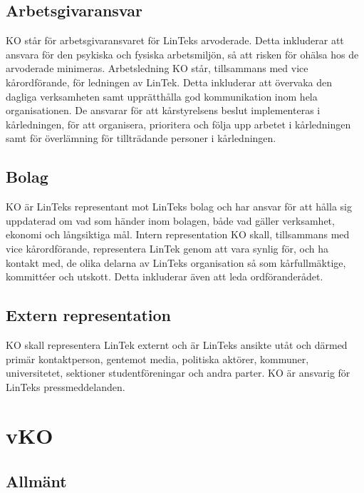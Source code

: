 \hypertarget{arbetsgivaransvar}{%
\subsection{Arbetsgivaransvar}\label{arbetsgivaransvar}}

KO står för arbetsgivaransvaret för LinTeks arvoderade. Detta inkluderar
att ansvara för den psykiska och fysiska arbetsmiljön, så att risken för
ohälsa hos de arvoderade minimeras. Arbetsledning KO står, tillsammans
med vice kårordförande, för ledningen av LinTek. Detta inkluderar att
övervaka den dagliga verksamheten samt upprätthålla god kommunikation
inom hela organisationen. De ansvarar för att kårstyrelsens beslut
implementeras i kårledningen, för att organisera, prioritera och följa
upp arbetet i kårledningen samt för överlämning för tillträdande
personer i kårledningen.

\hypertarget{bolag}{%
\subsection{Bolag}\label{bolag}}

KO är LinTeks representant mot LinTeks bolag och har ansvar för att
hålla sig uppdaterad om vad som händer inom bolagen, både vad gäller
verksamhet, ekonomi och långsiktiga mål. Intern representation KO skall,
tillsammans med vice kårordförande, representera LinTek genom att vara
synlig för, och ha kontakt med, de olika delarna av LinTeks organisation
så som kårfullmäktige, kommittéer och utskott. Detta inkluderar även att
leda ordföranderådet.

\hypertarget{extern-representation}{%
\subsection{Extern representation}\label{extern-representation}}

KO skall representera LinTek externt och är LinTeks ansikte utåt och
därmed primär kontaktperson, gentemot media, politiska aktörer,
kommuner, universitetet, sektioner studentföreningar och andra parter.
KO är ansvarig för LinTeks pressmeddelanden.

\hypertarget{vko}{%
\section{vKO}\label{vko}}

\hypertarget{allmuxe4nt-1}{%
\subsection{Allmänt}\label{allmuxe4nt-1}}


